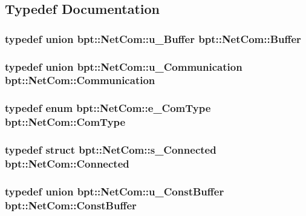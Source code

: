 \subsection{Typedef Documentation}
\hypertarget{namespacebpt_1_1_net_com_ab30a61348361333a522ae21fb65fdbd0}{
\subsubsection[{Buffer}]{\setlength{\rightskip}{0pt plus 5cm}typedef union {\bf bpt\-::\-Net\-Com\-::u\-\_\-\-Buffer}			 {\bf bpt\-::\-Net\-Com\-::\-Buffer}}}\label{namespacebpt_1_1_net_com_ab30a61348361333a522ae21fb65fdbd0}
\hypertarget{namespacebpt_1_1_net_com_af30d27373a967c6e6bcbf97963e2ab1d}{
\subsubsection[{Communication}]{\setlength{\rightskip}{0pt plus 5cm}typedef union {\bf bpt\-::\-Net\-Com\-::u\-\_\-\-Communication}			 {\bf bpt\-::\-Net\-Com\-::\-Communication}}}\label{namespacebpt_1_1_net_com_af30d27373a967c6e6bcbf97963e2ab1d}
\hypertarget{namespacebpt_1_1_net_com_a73b47b2b099bf7d28997dc72c921212c}{
\subsubsection[{Com\-Type}]{\setlength{\rightskip}{0pt plus 5cm}typedef enum {\bf bpt\-::\-Net\-Com\-::e\-\_\-\-Com\-Type}			 {\bf bpt\-::\-Net\-Com\-::\-Com\-Type}}}\label{namespacebpt_1_1_net_com_a73b47b2b099bf7d28997dc72c921212c}
\hypertarget{namespacebpt_1_1_net_com_a4704a0eb0b7d8aa56b2f17fb7536e61e}{
\subsubsection[{Connected}]{\setlength{\rightskip}{0pt plus 5cm}typedef struct {\bf bpt\-::\-Net\-Com\-::s\-\_\-\-Connected}			 {\bf bpt\-::\-Net\-Com\-::\-Connected}}}\label{namespacebpt_1_1_net_com_a4704a0eb0b7d8aa56b2f17fb7536e61e}
\hypertarget{namespacebpt_1_1_net_com_a14dfd9cc896549a6141d0801f8631771}{
\subsubsection[{Const\-Buffer}]{\setlength{\rightskip}{0pt plus 5cm}typedef union {\bf bpt\-::\-Net\-Com\-::u\-\_\-\-Const\-Buffer}			 {\bf bpt\-::\-Net\-Com\-::\-Const\-Buffer}}}\label{namespacebpt_1_1_net_com_a14dfd9cc896549a6141d0801f8631771}
